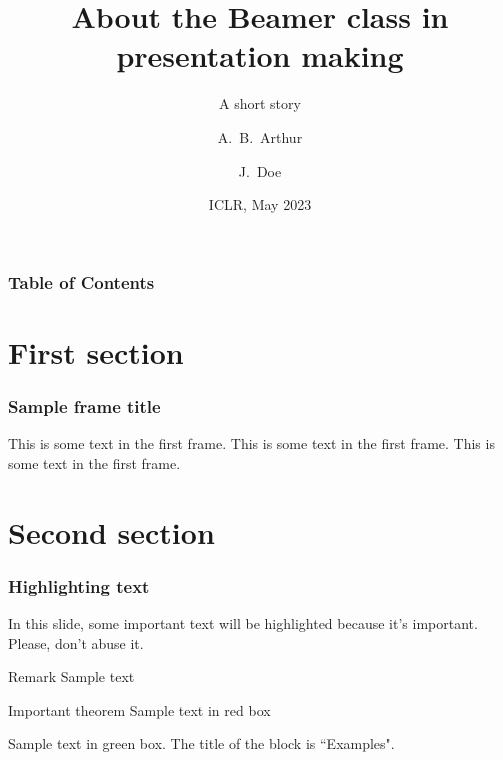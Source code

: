 \documentclass{beamer}
\title[About Beamer]
{About the Beamer class in presentation making}
\subtitle{A short story}
\author[Arthur, Doe] %
{A.~B.~Arthur\inst{1} \and J.~Doe\inst{2}}
\institute[UofT] %
{
  \inst{1}%
  Faculty of Physics\\
  Very Famous University
  \and
  \inst{2}%
  Faculty of Chemistry\\
  Very Famous University
}
\date[ICLR 2023] %
{ICLR, May 2023}
\begin{document}
\frame{\titlepage}

\begin{frame}
\frametitle{Table of Contents}
\tableofcontents
\end{frame}

\section{First section}

\begin{frame}
\frametitle{Sample frame title}
This is some text in the first frame. This is some text in the first frame. This is some text in the first frame.
\end{frame}

\section{Second section}

\begin{frame}
\frametitle{Highlighting text}

In this slide, some important text will be
\alert{highlighted} because it's important.
Please, don't abuse it.

\begin{block}{Remark}
Sample text
\end{block}

\begin{alertblock}{Important theorem}
Sample text in red box
\end{alertblock}

\begin{examples}
Sample text in green box. The title of the block is ``Examples".
\end{examples}
\end{frame}
\end{document}
